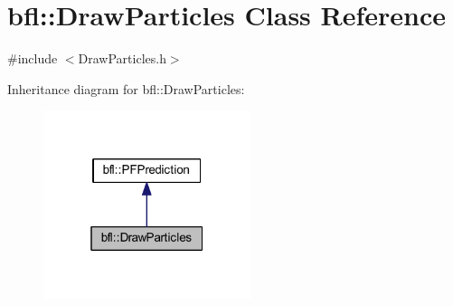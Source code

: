 \hypertarget{classbfl_1_1DrawParticles}{}\section{bfl\+:\+:Draw\+Particles Class Reference}
\label{classbfl_1_1DrawParticles}


{\ttfamily \#include $<$Draw\+Particles.\+h$>$}



Inheritance diagram for bfl\+:\+:Draw\+Particles\+:
\nopagebreak
\begin{figure}[H]
\begin{center}
\leavevmode
\includegraphics[width=172pt]{classbfl_1_1DrawParticles__inherit__graph}
\end{center}
\end{figure}
